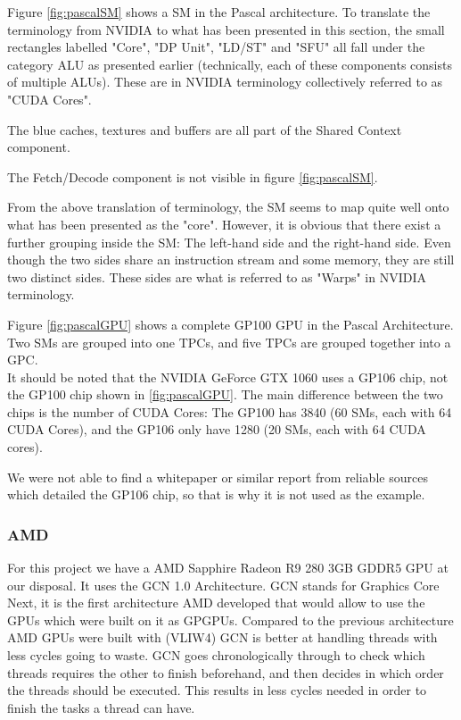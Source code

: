 Figure \ref{fig:pascalSM} shows a \gls{SM} in the Pascal architecture.
To translate the terminology from NVIDIA to what has been presented in this section, the small rectangles labelled "Core", "DP Unit", "LD/ST" and "SFU" all fall under the category \gls{ALU} as presented earlier (technically, each of these components consists of multiple \glspl{ALU}).
These are in NVIDIA terminology collectively referred to as "CUDA Cores".

The blue caches, textures and buffers are all part of the Shared Context component.

The Fetch/Decode component is not visible in figure \ref{fig:pascalSM}.

From the above translation of terminology, the \gls{SM} seems to map quite well onto what has been presented as the "core".
However, it is obvious that there exist a further grouping inside the \gls{SM}: The left-hand side and the right-hand side.
Even though the two sides share an instruction stream and some memory, they are still two distinct sides.
These sides are what is referred to as "Warps" in NVIDIA terminology.


Figure \ref{fig:pascalGPU} shows a complete GP100 GPU in the Pascal Architecture.
Two \glspl{SM} are grouped into one \glspl{TPC}, and five \glspl{TPC} are grouped together into a \gls{GPC}. \\

It should be noted that the NVIDIA GeForce GTX 1060 uses a GP106 chip, not the GP100 chip shown in \ref{fig:pascalGPU}. 
The main difference between the two chips is the number of CUDA Cores: The GP100 has 3840 (60 \glspl{SM}, each with 64 CUDA Cores), and the GP106 only have 1280 (20 \glspl{SM}, each with 64 CUDA cores).

We were not able to find a whitepaper or similar report from reliable sources which detailed the GP106 chip, so that is why it is not used as the example. 


\subsubsection{AMD}
For this project we have a AMD Sapphire Radeon R9 280 3GB GDDR5 \gls{GPU} at our disposal. 
It uses the GCN 1.0 Architecture.
GCN stands for Graphics Core Next, it is the first architecture AMD developed that would allow to use the \glspl{GPU} which were built on it as \glspl{GPGPU}.
Compared to the previous architecture AMD \glspl{GPU} were built with (VLIW4) GCN is better at handling threads with less cycles going to waste.
GCN goes chronologically through to check which threads requires the other to finish beforehand, and then decides in which order the threads should be executed.
This results in less cycles needed in order to finish the tasks a thread can have.

